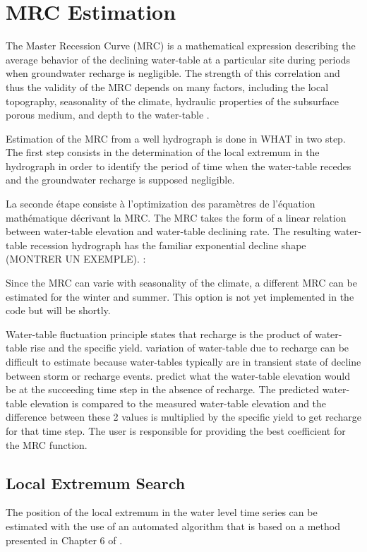 \documentclass[WHATMANUAL.tex]{subfiles}
\begin{document}
\chapter{MRC Estimation}

The Master Recession Curve (MRC) is a mathematical expression describing the average behavior of the declining water-table at a particular site during periods when groundwater recharge is negligible. The strength of this correlation and thus the validity of the MRC depends on many factors, including the local topography, seasonality of the climate, hydraulic properties of the subsurface porous medium, and depth to the water-table \citep{heppner_computer_2005}. 

Estimation of the MRC from a well hydrograph is done in WHAT in two step. The first step consists in the determination of the local extremum in the hydrograph in order to identify the period of time when the water-table recedes and the groundwater recharge is supposed negligible. 

La seconde étape consiste à l'optimization des paramètres de l'équation mathématique décrivant la MRC. The MRC takes the form of a linear relation between water-table elevation and water-table declining rate. The resulting water-table recession hydrograph has the familiar exponential decline shape (MONTRER UN EXEMPLE). :

Since the MRC can varie with seasonality of the climate, a different MRC can be estimated for the winter and summer. This option is not yet implemented in the code but will be shortly.

Water-table fluctuation principle states that recharge is the product of water-table rise and the specific yield. variation of water-table due to recharge can be difficult to estimate because water-tables typically are in transient state of decline between storm or recharge events. predict what the water-table elevation would be at the succeeding time step in the absence of recharge. The predicted water-table elevation is compared to the measured water-table elevation and the difference between these 2 values is multiplied by the specific yield to get recharge for that time step. The user is responsible for providing the best coefficient for the MRC function.

\section{Local Extremum Search}

The position of the local extremum in the water level time series can be estimated with the use of an automated algorithm that is based on a method presented in Chapter 6 of \cite{vamos_automatic_2012}.
\end{document}
